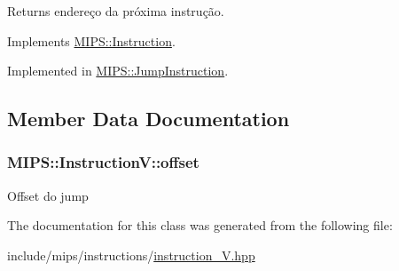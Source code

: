 \begin{DoxyReturn}{Returns}
endereço da próxima instrução. 
\end{DoxyReturn}


Implements \hyperlink{classMIPS_1_1Instruction_a88668dfaf49dd8608f210ba13948d242}{M\+I\+P\+S\+::\+Instruction}.



Implemented in \hyperlink{classMIPS_1_1JumpInstruction_a843961af93d20e35dd1fab6bf341e16e}{M\+I\+P\+S\+::\+Jump\+Instruction}.



\subsection{Member Data Documentation}
\subsubsection[{\texorpdfstring{offset}{offset}}]{ M\+I\+P\+S\+::\+Instruction\+V\+::offset\hspace{0.3cm}{\ttfamily [protected]}}\hypertarget{classMIPS_1_1InstructionV_ac2e294fde4971aa6a149480f22ae29e9}{}\label{classMIPS_1_1InstructionV_ac2e294fde4971aa6a149480f22ae29e9}
Offset do jump 

The documentation for this class was generated from the following file\+:\begin{DoxyCompactItemize}
\item 
include/mips/instructions/\hyperlink{instruction__V_8hpp}{instruction\+\_\+\+V.\+hpp}\end{DoxyCompactItemize}
